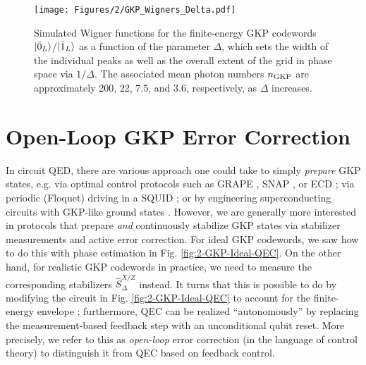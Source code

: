 \begin{figure}[h]
    \centering
    \texttt{[image: Figures/2/GKP\_Wigners\_Delta.pdf]}
    \caption{Simulated Wigner functions for the finite-energy GKP codewords $\lvert\tilde{0}_L\rangle$/$\lvert\tilde{1}_L\rangle$ as a function of the parameter $\Delta$, which sets the width of the individual peaks as well as the overall extent of the grid in phase space via $1/\Delta$. The associated mean photon numbers $n_{\rm GKP}$ are approximately 200, 22, 7.5, and 3.6, respectively, as $\Delta$ increases.}
    \label{fig:2_GKP_Wigners_Delta}
\end{figure}


\section{Open-Loop GKP Error Correction \label{sec:2_OpenLoopGKPQEC}}

In circuit QED, there are various approach one could take to simply \textit{prepare} GKP states, e.g. via optimal control protocols such as GRAPE \cite{khaneja2005grape, reinhold2019thesis}, SNAP \cite{krastanov2015-SNAP, heeres2015-SNAP, fosel2020-SNAP}, or ECD \cite{eickbusch2022fast}; via periodic (Floquet) driving in a SQUID \cite{gkp-periodic-drive2024}; or by engineering superconducting circuits with GKP-like ground states \cite{rymarz2021hardwaregkp}. However, we are generally more interested in protocols that prepare \textit{and} continuously stabilize GKP states via stabilizer measurements and active error correction. For ideal GKP codewords, we saw how to do this with phase estimation in Fig. \ref{fig:2-GKP-Ideal-QEC}. On the other hand, for realistic GKP codewords in practice, we need to measure the corresponding stabilizers $\hat{S}_\Delta^{X/Z}$ instead. It turns that this is possible to do by modifying the circuit in Fig. \ref{fig:2-GKP-Ideal-QEC} to account for the finite-energy envelope \cite{fluhmann2019gkp-expt, campagne2020gkp-expt, royer2020gkp, deneeve2022gkp-expt}; furthermore, QEC can be realized ``autonomously'' by replacing the measurement-based feedback step with an unconditional qubit reset. More precisely, we refer to this as \textit{open-loop} error correction (in the language of control theory) to distinguish it from QEC based on feedback control.

